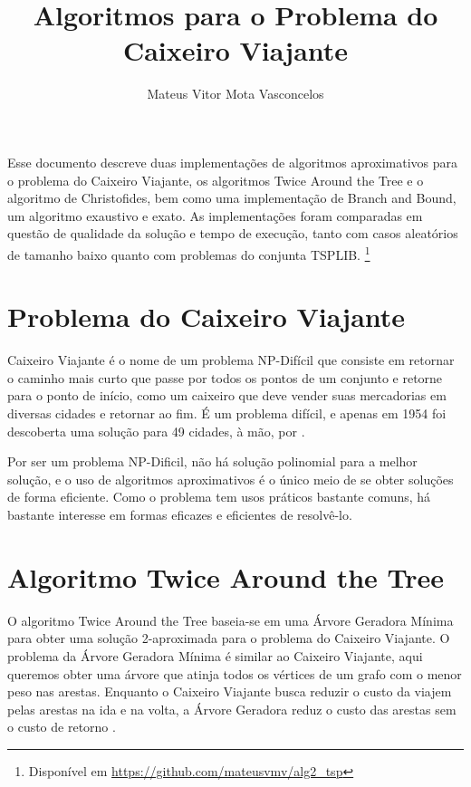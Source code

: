 \documentclass[12pt]{article}
\title{Algoritmos para o Problema do Caixeiro Viajante}
\author{Mateus Vitor Mota Vasconcelos\inst{1}}
\begin{document}
\maketitle

\begin{resumo} 
  Esse documento descreve duas implementações de algoritmos aproximativos para
  o problema do Caixeiro Viajante, os algoritmos Twice Around the Tree e
  o algoritmo de Christofides, bem como uma implementação de Branch and Bound,
  um algoritmo exaustivo e exato. As implementações foram comparadas em questão
  de qualidade da solução e tempo de execução, tanto com casos aleatórios de tamanho
  baixo quanto com problemas do conjunta TSPLIB.
  \footnote{Disponível em \url{https://github.com/mateusvmv/alg2_tsp}}
\end{resumo}

\section{Problema do Caixeiro Viajante}
Caixeiro Viajante é o nome de um problema NP-Difícil \cite{cormen2009introduction} que consiste em retornar
o caminho mais curto que passe por todos os pontos de um conjunto e retorne
para o ponto de início, como um caixeiro que deve vender suas mercadorias em
diversas cidades e retornar ao fim. É um problema difícil, e apenas em 1954
foi descoberta uma solução para 49 cidades, à mão, por \cite{dantzig1954solution}.

Por ser um problema NP-Dificil, não há solução polinomial para a melhor solução,
e o uso de algoritmos aproximativos é o único meio de se obter soluções de forma
eficiente. Como o problema tem usos práticos bastante comuns, há bastante interesse
em formas eficazes e eficientes de resolvê-lo.

\section{Algoritmo Twice Around the Tree}
O algoritmo Twice Around the Tree baseia-se em uma Árvore Geradora Mínima para
obter uma solução 2-aproximada para o problema do Caixeiro Viajante. O problema da
Árvore Geradora Mínima é similar ao Caixeiro Viajante, aqui queremos obter uma
árvore que atinja todos os vértices de um grafo com o menor peso nas arestas.
Enquanto o Caixeiro Viajante busca reduzir o custo da viajem pelas arestas na ida
e na volta, a Árvore Geradora reduz o custo das arestas sem o custo de retorno
\cite{rosenkrantz1977analysis}.
\end{document}
